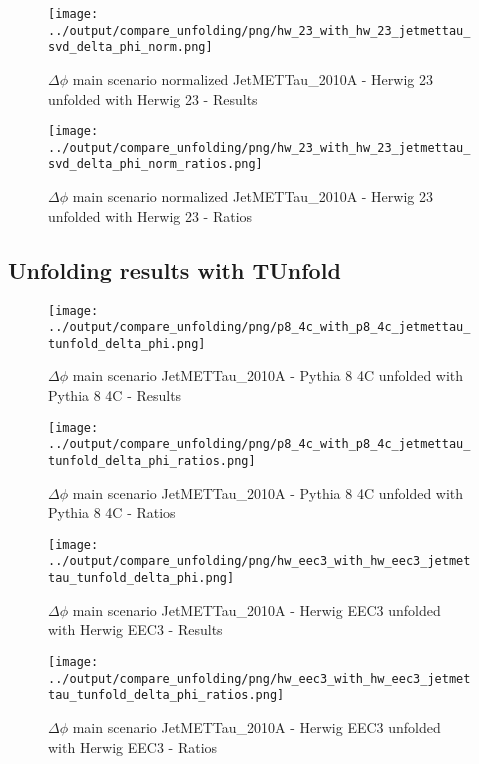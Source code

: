 \documentclass[11pt]{book}
\begin{document}
\begin{figure}[ht]
\centering
\texttt{[image: ../output/compare\_unfolding/png/hw\_23\_with\_hw\_23\_jetmettau\_svd\_delta\_phi\_norm.png]}
\caption{$\Delta\phi$ main scenario normalized JetMETTau\_2010A - Herwig 23 unfolded with Herwig 23 - Results}
\label{hw_23_hw_23_jetmettau_svd_delta_phi_norm_a}
\end{figure}

\begin{figure}[ht]
\centering
\texttt{[image: ../output/compare\_unfolding/png/hw\_23\_with\_hw\_23\_jetmettau\_svd\_delta\_phi\_norm\_ratios.png]}
\caption{$\Delta\phi$ main scenario normalized JetMETTau\_2010A - Herwig 23 unfolded with Herwig 23 - Ratios}
\label{hw_23_jetmettau_svd_delta_phi_norm_b}
\end{figure}



\clearpage
\subsection{Unfolding results with TUnfold}

\begin{figure}[ht]
\centering
\texttt{[image: ../output/compare\_unfolding/png/p8\_4c\_with\_p8\_4c\_jetmettau\_tunfold\_delta\_phi.png]}
\caption{$\Delta\phi$ main scenario JetMETTau\_2010A - Pythia 8 4C unfolded with Pythia 8 4C - Results}
\label{p8_p8_jetmettau_tunfold_delta_phi_a}
\end{figure}

\begin{figure}[ht]
\centering
\texttt{[image: ../output/compare\_unfolding/png/p8\_4c\_with\_p8\_4c\_jetmettau\_tunfold\_delta\_phi\_ratios.png]}
\caption{$\Delta\phi$ main scenario JetMETTau\_2010A - Pythia 8 4C unfolded with Pythia 8 4C - Ratios}
\label{p8_p8_jetmettau_tunfold_delta_phi_b}
\end{figure}

\begin{figure}[ht]
\centering
\texttt{[image: ../output/compare\_unfolding/png/hw\_eec3\_with\_hw\_eec3\_jetmettau\_tunfold\_delta\_phi.png]}
\caption{$\Delta\phi$ main scenario JetMETTau\_2010A - Herwig EEC3 unfolded with Herwig EEC3 - Results}
\label{hw_eec3_hw_eec3_jetmettau_tunfold_delta_phi_a}
\end{figure}

\begin{figure}[ht]
\centering
\texttt{[image: ../output/compare\_unfolding/png/hw\_eec3\_with\_hw\_eec3\_jetmettau\_tunfold\_delta\_phi\_ratios.png]}
\caption{$\Delta\phi$ main scenario JetMETTau\_2010A - Herwig EEC3 unfolded with Herwig EEC3 - Ratios}
\label{hw_eec3_jetmettau_tunfold_delta_phi_b}
\end{figure}
\end{document}
